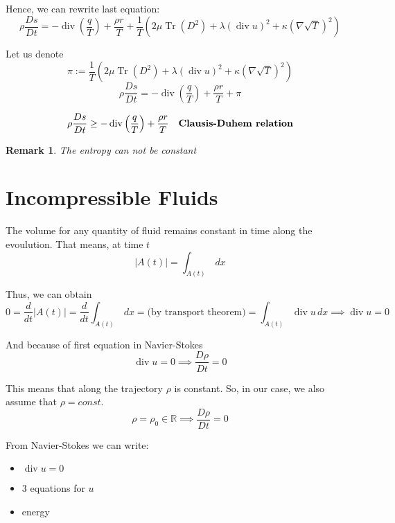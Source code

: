 \documentclass[12pt]{article}
\DeclareMathOperator{\Tr}{Tr}
\DeclareMathOperator{\Div}{div}
\newtheorem{remark}{Remark}
\begin{document}
Hence, we can rewrite last equation:
$$  
    \rho\dfrac{Ds}{Dt} = -\Div\left(\dfrac{q}{T}\right) +
    \dfrac{\rho r}{T} + \dfrac{1}{T}\left(2\mu\Tr(D^2) + 
    \lambda(\Div u)^2 + \kappa(\nabla\sqrt{T})^2\right)
$$

\noindent{}

Let us denote
$$
    \pi := \dfrac{1}{T}\left(2\mu\Tr(D^2) + 
    \lambda(\Div u)^2 + \kappa(\nabla\sqrt{T})^2\right)
$$
$$
    \rho\dfrac{Ds}{Dt} = -\Div\left(\dfrac{q}{T}\right) +
    \dfrac{\rho r}{T} + \pi
$$

\noindent{}

$$
    \rho\dfrac{Ds}{Dt} \geq -\Div\left(\dfrac{q}{T}\right) +
    \dfrac{\rho r}{T}\quad\text{\textbf{Clausis-Duhem relation}}
$$

\begin{remark}
    The entropy can not be constant
\end{remark}

\section{Incompressible Fluids}
The volume for any quantity of fluid remains constant in time
along the evoulution. That means, at time $t$
$$
    \vert A(t) \vert = \int_{A(t)} \,dx
$$

Thus, we can obtain
$$
    0 = \dfrac{d}{dt} \vert A(t) \vert = \dfrac{d}{dt}\int_{A(t)} \,dx
    = \text{(by transport theorem)} = \int_{A(t)} \Div u\,dx \implies
    \Div u = 0
$$

And because of first equation in Navier-Stokes
$$
 \Div u = 0 \implies \dfrac{D\rho}{Dt} = 0
$$

This means that along the trajectory $\rho$ is constant. So, in our
case, we also assume that $\rho = const$.
$$
    \rho = \rho_0 \in \mathbb{R} \implies \dfrac{D\rho}{Dt} = 0
$$

From Navier-Stokes we can write:
\begin{itemize}
    \item $\Div u = 0$
    \item 3 equations for $u$
    \item energy
\end{itemize}
\end{document}
